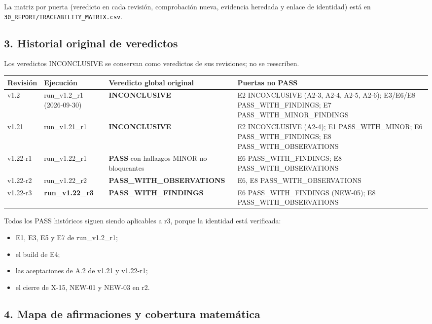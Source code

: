 \documentclass[
]{article}
\newcounter{none} %
\providecommand{\tightlist}{%
  \setlength{\itemsep}{0pt}\setlength{\parskip}{0pt}}
\begin{document}
La matriz por puerta (veredicto en cada revisión, comprobación nueva,
evidencia heredada y enlace de identidad) está en
\texttt{30\_REPORT/TRACEABILITY\_MATRIX.csv}.

\subsection{3. Historial original de
veredictos}\label{3-historial-original-de-veredictos}

Los veredictos INCONCLUSIVE se conservan como veredictos de sus
revisiones; no se reescriben.

{\def\LTcaptype{none} %
\begin{longtable}[]{@{}llll@{}}
\toprule\noalign{}
Revisión & Ejecución & Veredicto global original & Puertas no PASS \\
\midrule\noalign{}
\endhead
\bottomrule\noalign{}
\endlastfoot
v1.2 & run\_v1.2\_r1 (2026-09-30) & \textbf{INCONCLUSIVE} & E2
INCONCLUSIVE (A2-3, A2-4, A2-5, A2-6); E3/E6/E8 PASS\_WITH\_FINDINGS; E7
PASS\_WITH\_MINOR\_FINDINGS \\
v1.21 & run\_v1.21\_r1 & \textbf{INCONCLUSIVE} & E2 INCONCLUSIVE (A2-4);
E1 PASS\_WITH\_MINOR; E6 PASS\_WITH\_FINDINGS; E8
PASS\_WITH\_OBSERVATIONS \\
v1.22-r1 & run\_v1.22\_r1 & \textbf{PASS} con hallazgos MINOR no
bloqueantes & E6 PASS\_WITH\_FINDINGS; E8 PASS\_WITH\_OBSERVATIONS \\
v1.22-r2 & run\_v1.22\_r2 & \textbf{PASS\_WITH\_OBSERVATIONS} & E6, E8
PASS\_WITH\_OBSERVATIONS \\
v1.22-r3 & \textbf{run\_v1.22\_r3} & \textbf{PASS\_WITH\_FINDINGS} & E6
PASS\_WITH\_FINDINGS (NEW-05); E8 PASS\_WITH\_OBSERVATIONS \\
\end{longtable}
}

Todos los PASS históricos siguen siendo aplicables a r3, porque la
identidad está verificada:

\begin{itemize}
\tightlist
\item
  E1, E3, E5 y E7 de run\_v1.2\_r1;
\item
  el build de E4;
\item
  las aceptaciones de A.2 de v1.21 y v1.22-r1;
\item
  el cierre de X-15, NEW-01 y NEW-03 en r2.
\end{itemize}

\subsection{4. Mapa de afirmaciones y cobertura
matemática}\label{4-mapa-de-afirmaciones-y-cobertura-matemuxe1tica}
\end{document}
